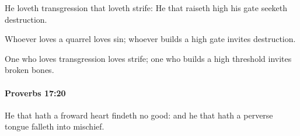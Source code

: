 			\begin{versebox}
					\item[BHS] 
					\item[ASV] He loveth transgression that loveth strife: He that raiseth high his gate seeketh destruction.
					\item[NIV] Whoever loves a quarrel loves sin; whoever builds a high gate invites destruction.
					\item[NRSV] One who loves transgression loves strife; one who builds a high threshold invites broken bones.
			\end{versebox}

		\paragraph{Proverbs 17:20} %
			\label{PROVERBS-17-20}

			He that hath a froward heart findeth no good: and he that hath a perverse tongue falleth into mischief.

